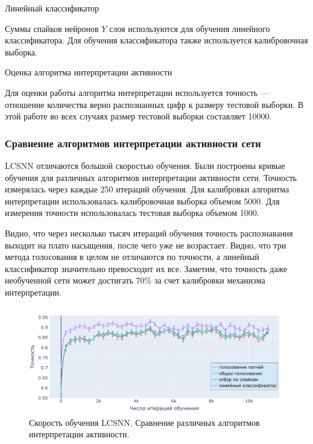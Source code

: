 \documentclass[a4paper]{article}
\begin{document}
\begin{center}
 Линейный классификатор
\end{center}
Суммы спайков нейронов $Y$ слоя используются для обучения линейного классификатора. Для обучения классификатора также используется калибровочная выборка.

\begin{center}
 Оценка алгоритма интерпретации активности
\end{center}
Для оценки работы алгоритма интерпретации используется точность --- отношение количества верно распознанных цифр к размеру тестовой выборки. В этой работе во всех случаях размер тестовой выборки составляет 10000. 

\subsubsection{Сравнение алгоритмов интерпретации активности сети}
LCSNN отличаются большой скоростью обучения. Были построены кривые обучения для различных алгоритмов интерпретации активности сети. Точность измерялась через каждые 250 итераций обучения. Для калибровки алгоритма интерпретации использовалась калибровочная выборка объемом 5000. Для измерения точности использовалась тестовая выборка объемом 1000.

Видно, что через несколько тысяч итераций обучения точность распознавания выходит на плато насыщения, после чего уже не возрастает. Видно, что три метода голосования в целом не отличаются по точности, а линейный классификатор значительно превосходит их все. Заметим, что точность даже необученной сети может достигать 70\% за счет калибровки механизма интерпретации.

\begin{center}
\begin{figure}[H]
 \includegraphics[width=\textwidth,keepaspectratio=true]{LCSNN_learning_rate_ru.pdf}
 \caption{Скорость обучения LCSNN. Сравнение различных алгоритмов интерпретации активности.}
\end{figure} 
\end{center}
 
\end{document}
